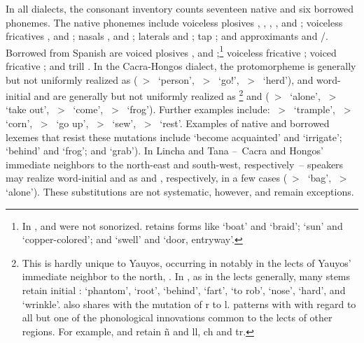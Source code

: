 {In all dialects, the consonant inventory counts seventeen native and six borrowed phonemes. The native phonemes include voiceless plosives , , , ,  and ; voiceless fricatives ,  and ; nasals ,  and ; laterals  and ; tap ; and approximants  and /. Borrowed from Spanish are voiced plosives ,  and ;\footnote{In \SYQ,   and  were not sonorized. \SYQ{} retains \PQ{} forms like  ‘boat’ and  ‘braid’;  ‘sun’ and  ‘copper-colored’; and  ‘swell’ and  ‘door, entryway’.} voiceless fricative ; voiced fricative ; and trill . In the Cacra-Hongos dialect, the protomorpheme  is generally but not uniformly realized as \textipa{[l]} (\textipa{*}~>~ ‘person’, \textipa{*}~>~ ‘go!’, \textipa{*}~>~ ‘herd’), and word-initial  and  are generally but not uniformly realized as \textipa{[h]}\footnote{This is hardly unique to Yauyos, occurring in notably in the lects of Yauyos’ immediate neighbor to the north, . In \CH, as in the \QB{} lects generally, many stems retain initial :  ‘phantom’,  ‘root’,  ‘behind’,  ‘fart’,  ‘to rob’,  ‘nose’,  ‘hard’, and  ‘wrinkle’. \CH{} also shares with  the mutation of r to l. \CH{} patterns with  with regard to all but one of the phonological innovations common to the lects of other \QB{} regions. For example, \CH{} and  retain ñ and ll, ch and tr.} and \textipa{[ʃ]} (\textipa{*}~>~ ‘alone’, \textipa{*}~>~ ‘take out’, \textipa{*}~>~ ‘come’, \textipa{*}~>~ ‘frog’). Further examples include: ~>~ ‘trample’, ~>~ ‘corn’, ~>~ ‘go up’, ~>~ ‘sew’, ~>~ ‘rest’. Examples of native and borrowed lexemes that resist these mutations include  ‘become acquainted’ and  ‘irrigate’;  ‘behind’ and  ‘frog’; and  ‘grab’). In Lincha and Tana --~Cacra and Hongos’ immediate neighbors to the north-east and south-west, respectively~-- speakers may realize word-initial  and  as \textipa{[l]} and \textipa{[h]}, respectively, in a few cases (\textipa{*}~>~ ‘bag’, \textipa{*}~>~ ‘alone’). These substitutions are not systematic, however, and remain exceptions.

}
